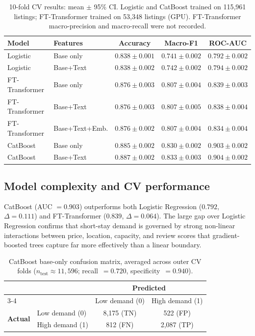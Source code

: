 \documentclass[10pt,a4paper]{article}
\newcommand{\reporttabcolsep}{4pt}
\begin{document}
\begin{table}[H]
\centering\small
\setlength{\tabcolsep}{\reporttabcolsep}
\begin{tabular}{llccc}
\toprule
Model & Features & Accuracy & Macro-F1 & ROC-AUC \\
\midrule
Logistic       & Base only      & $0.838\pm0.001$ & $0.741\pm0.002$ & $0.792\pm0.002$ \\
Logistic       & Base+Text      & $0.838\pm0.002$ & $0.742\pm0.002$ & $0.794\pm0.002$ \\
FT-Transformer & Base only      & $0.876\pm0.003$ & $0.807\pm0.004$ & $0.839\pm0.003$ \\
FT-Transformer & Base+Text      & $0.876\pm0.003$ & $0.807\pm0.005$ & $0.838\pm0.004$ \\
FT-Transformer & Base+Text+Emb. & $0.876\pm0.002$ & $0.807\pm0.004$ & $0.834\pm0.004$ \\
CatBoost       & Base only      & $0.885\pm0.002$ & $0.830\pm0.002$ & $0.903\pm0.002$ \\
CatBoost       & Base+Text      & $0.887\pm0.002$ & $0.833\pm0.003$ & $\mathbf{0.904\pm0.002}$ \\
\bottomrule
\end{tabular}
\caption{10-fold CV results: mean $\pm$ 95\% CI. Logistic and CatBoost trained
  on 115{,}961 listings; FT-Transformer trained on 53{,}348 listings (GPU).
  FT-Transformer macro-precision and macro-recall were not recorded.}
\label{tab:cv}
\end{table}

\subsection{Model complexity and CV performance}
CatBoost (AUC $= 0.903$) outperforms both Logistic Regression
($0.792$, $\Delta = 0.111$) and FT-Transformer ($0.839$, $\Delta = 0.064$).
The large gap over Logistic Regression confirms that short-stay demand is
governed by strong non-linear interactions between price, location, capacity,
and review scores that gradient-boosted trees capture far more effectively
than a linear boundary.

\begin{table}[H]
\centering\small
\setlength{\tabcolsep}{\reporttabcolsep}
\begin{tabular}{llcc}
\toprule
 & & \multicolumn{2}{c}{\textbf{Predicted}} \\
\cmidrule(l){3-4}
 & & Low demand (0) & High demand (1) \\
\midrule
\multirow{2}{*}{\textbf{Actual}}
  & Low demand (0) & 8{,}175 (TN) &   522 (FP) \\
  & High demand (1) &   812 (FN) & 2{,}087 (TP) \\
\bottomrule
\end{tabular}
\caption{CatBoost base-only confusion matrix, averaged across outer CV folds
  ($n_{\text{test}}\approx11{,}596$; recall~$=0.720$, specificity~$=0.940$).}
\label{tab:cm}
\end{table}
\end{document}
